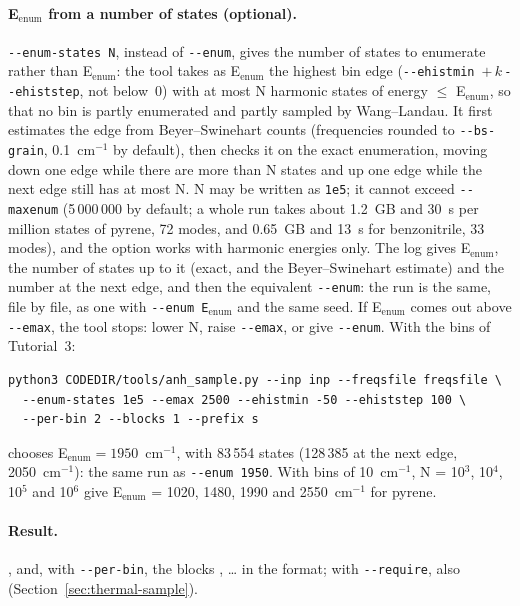 \paragraph{E$_\mathrm{enum}$ from a number of states (optional).}
\texttt{-{}-enum-states N}, instead of \texttt{-{}-enum}, gives the number
of states to enumerate rather than E$_\mathrm{enum}$: the tool takes as
E$_\mathrm{enum}$ the highest bin edge
(\texttt{-{}-ehistmin}~$+\,k\,$\texttt{-{}-ehiststep}, not below~0) with
at most N harmonic states of energy $\le$ E$_\mathrm{enum}$, so that no
bin is partly enumerated and partly sampled by Wang--Landau. It first
estimates the edge from Beyer--Swinehart counts (frequencies rounded to
\texttt{-{}-bs-grain}, 0.1~cm$^{-1}$ by default), then checks it on the
exact enumeration, moving down one edge while there are more than N states
and up one edge while the next edge still has at most N. N may be written
as \texttt{1e5}; it cannot exceed \texttt{-{}-maxenum} (5\,000\,000 by
default; a whole run takes about 1.2~GB and 30~s per million states of
pyrene, 72 modes, and 0.65~GB and 13~s for benzonitrile, 33 modes), and the option works with harmonic energies only. The
log gives E$_\mathrm{enum}$, the number of states up to it (exact, and the
Beyer--Swinehart estimate) and the number at the next edge, and then the
equivalent \texttt{-{}-enum}: the run is the same, file by file, as one
with \texttt{-{}-enum E$_\mathrm{enum}$} and the same seed. If
E$_\mathrm{enum}$ comes out above \texttt{-{}-emax}, the tool stops: lower
N, raise \texttt{-{}-emax}, or give \texttt{-{}-enum}. With the bins of
Tutorial~3:
\begin{lstlisting}
python3 CODEDIR/tools/anh_sample.py --inp inp --freqsfile freqsfile \
  --enum-states 1e5 --emax 2500 --ehistmin -50 --ehiststep 100 \
  --per-bin 2 --blocks 1 --prefix s
\end{lstlisting}
chooses E$_\mathrm{enum} = 1950$~cm$^{-1}$, with 83\,554 states
(128\,385 at the next edge, 2050~cm$^{-1}$): the same run as
\texttt{-{}-enum 1950}. With bins of 10~cm$^{-1}$, N = 10$^3$, 10$^4$,
10$^5$ and 10$^6$ give E$_\mathrm{enum}$ = 1020, 1480, 1990 and
2550~cm$^{-1}$ for pyrene.

\paragraph{Result.} ,  and,
with \texttt{-{}-per-bin}, the blocks ,
\ldots{} in the \file{quantafile} format; with \texttt{-{}-require}, also
\file{PREFIX\_require.dat} (Section~\ref{sec:thermal-sample}).

